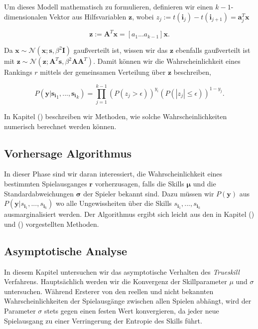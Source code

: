\documentclass[12pt,a4paper]{scrartcl}
\numberwithin{equation}{section}
\begin{document}
   Um dieses Modell mathematisch zu formulieren, definieren wir einen $k-1$-dimensionalen Vektor aus Hilfsvariablen $\mathbf{z}$, wobei $z_j := t(\mathbf{i}_j) - t(\mathbf{i}_{j+1}) = \mathbf{a}_j^T \mathbf{x}$
   
   \begin{equation}
    \mathbf{z} := \mathbf{A}^T \mathbf{x} = [a_1 ... a_{k-1}] \mathbf{x}.
   \end{equation}
   
   Da $\mathbf{x} \sim \mathcal{N}(\mathbf{x};\mathbf{s}, \beta^2 \mathbf{I})$ gaußverteilt ist, wissen wir das $\mathbf{z}$ ebenfalls gaußverteilt ist mit
   $\mathbf{z} \sim \mathcal{N}(\mathbf{z}; \mathbf{A}^T \mathbf{s}, \beta^2 \mathbf{A} \mathbf{A}^T) $.
   Damit können wir die Wahrscheinlichkeit eines Rankings $r$ mittels der gemeinsamen Verteilung über $\mathbf{z}$ beschreiben, 
   
   \begin{equation}
    P(\mathbf{y}| \mathbf{s_i}_1,...,\mathbf{s_i}_k) = \prod_{j = 1}^{k-1} (P(z_j > \epsilon))^{y_i}(P(|z_j| \leq \epsilon))^{1 - y_j}.
   \end{equation}
   
   In Kapitel () beschreiben wir Methoden, wie solche Wahrscheinlichkeiten numerisch berechnet werden können. 

   \subsection{Vorhersage Algorithmus}
   
   In dieser Phase sind wir daran interessiert, die Wahrscheinlichkeit eines bestimmten Spielausganges $\mathbf{r}$ vorherzusagen, falls die Skills $\mathbf{\mu}$ und die
   Standardabweichungen $\mathbf{\sigma}$ der Spieler bekannt sind. Dazu müssen wir $P(\mathbf{y})$ aus $P(\mathbf{y}|s_{\mathbf{i}}_1,...,s_{\mathbf{i}}_k)$ wo alle Ungewissheiten
   über die Skills $s_{\mathbf{i}}_1,...,s_{\mathbf{i}}_k$ ausmarginalisiert werden. Der Algorithmus ergibt sich leicht aus den in Kapitel () und () vorgestellten Methoden.
  
   \subsection{Asymptotische Analyse }
   
   In diesem Kapitel untersuchen wir das asymptotische Verhalten des \textit{Trueskill} Verfahrens. Hauptsächlich werden wir die Konvergenz der Skillparameter $\mu$ und $\sigma$ untersuchen.
   Während Ersterer von den reellen und nicht bekannten Wahrscheinlichkeiten der Spielausgänge zwischen allen Spielen abhängt, wird der Parameter $\sigma$ stets gegen einen festen
   Wert konvergieren, da jeder neue Spielausgang zu einer Verringerung der Entropie des Skills führt.  
   
\end{document}
